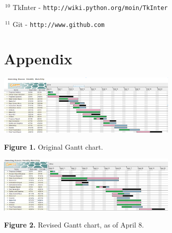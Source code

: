 \documentclass{article}
\begin{document}
\noindent
$\,^{10}$
TkInter - {\tt http://wiki.python.org/moin/TkInter}

\vspace{.3em}

\noindent
$\,^{11}$
Git - {\tt http://www.github.com}

\vspace{.3em}

\clearpage

\section*{Appendix}

\begin{center}

\includegraphics[width=330px]{Gantt.png}

{\bf Figure 1.} Original Gantt chart.
\end{center}


\begin{center}

\includegraphics[width=330px]{Gantt2.png}

{\bf Figure 2.} Revised Gantt chart, as of April 8.
\end{center}
\end{document}
